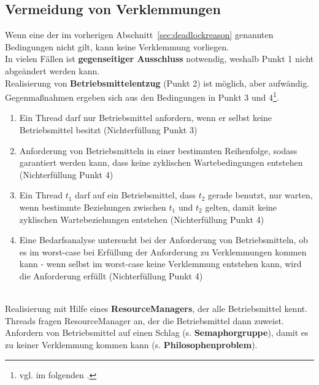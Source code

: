 \subsection{Vermeidung von Verklemmungen}

Wenn eine der im vorherigen Abschnitt~\ref{sec:deadlockreason} genannten Bedingungen nicht gilt, kann keine Verklemmung vorliegen.\\

\noindent
In vielen Fällen ist \textbf{gegenseitiger Ausschluss} notwendig, weshalb Punkt 1 nicht abgeändert werden kann.\\

\noindent
Realisierung von \textbf{Betriebsmittelentzug} (Punkt 2) ist möglich, aber aufwändig.\\

\noindent
Gegenmaßnahmen ergeben sich aus den Bedingungen in Punkt 3 und 4\footnote{
vgl. im folgenden \cite[192 f.]{Oec22}.
}.\\

\begin{enumerate}
    \item Ein Thread darf nur Betriebsmittel anfordern, wenn er selbst keine Betriebsmittel besitzt (Nichterfüllung Punkt 3)
    \item Anforderung von Betriebsmitteln in einer bestimmten Reihenfolge, sodass garantiert werden kann, dass keine zyklischen Wartebedingungen entstehen (Nichterfüllung Punkt 4)
    \item Ein Thread $t_1$ darf auf ein Betriebsmittel, dass $t_2$ gerade benutzt, nur warten, wenn bestimmte Beziehungen zwischen $t_1$ und $t_2$ gelten, damit keine zyklischen Wartebeziehungen entstehen (Nichterfüllung Punkt 4)
    \item Eine Bedarfsanalyse untersucht bei der Anforderung von Betriebsmitteln, ob es im worst-case bei Erfüllung der Anforderung zu Verklemmungen kommen kann - wenn selbst im worst-case keine Verklemmung entstehen kann, wird die Anforderung erfüllt (Nichterfüllung Punkt 4)
\end{enumerate}\\

\noindent
Realisierung mit Hilfe eines \textbf{ResourceManagers}, der alle Betriebsmittel kennt.\\

\noindent
Threads fragen ResourceManager an, der die Betriebsmittel dann zuweist.\\

\noindent
Anfordern von Betriebsmittel auf einen Schlag (s. \textbf{Semaphorgruppe}), damit es zu keiner Verklemmung kommen kann (s. \textbf{Philosophenproblem}).\\


